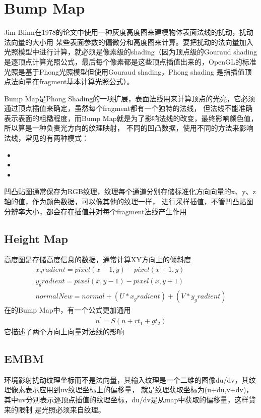 \section{Bump Map}

Jim Blinn在1978的论文中使用一种灰度高度图来建模物体表面法线的扰动，扰动法向量的大小用
某些表面参数的偏微分和高度图来计算。要把扰动的法向量加入光照模型中进行计算，就必须是像素级的shading（因为顶点级的Gouraud shading
是逐顶点计算光照公式，最后每个像素都是这些顶点插值出来的，OpenGL的标准光照是基于Phong光照模型但使用Gouraud shading，Phong shading
是指插值顶点法向量在fragment基本计算光照公式）。

Bump Map是Phong Shading的一项扩展，表面法线用来计算顶点的光亮，它必须通过顶点插值来确定，虽然每个fragment都有一个独特的法线，
但法线不能准确表示表面的粗糙程度，而Bump Map就是为了影响法线的改变，最终影响颜色值，所以算是一种负责光方向的纹理映射，
不同的凹凸数据，使用不同的方法来影响法线，常见的有两种模式：
\begin{itemize}
    \item {}
    \item {}
    \item {}
\end{itemize}

凹凸贴图通常保存为RGB纹理，纹理每个通道分别存储标准化方向向量的x、y、z轴的值，作为颜色数据，可以像其他的纹理一样，
进行采样插值，不管凹凸贴图分辨率大小，都会存在插值并对每个fragment法线产生作用


\subsection{Height Map}
高度图是存储高度信息的数据，通常计算XY方向上的倾斜度
\begin{gather*}
    x_gradient = pixel(x-1,y) - pixel(x+1,y) \\
    y_gradient = pixel(x,y-1) - pixel(x,y+1) \\
    normalNew = normal + (U * x_gradient) + (V * y_gradient)
\end{gather*}
在的Bump Map\cite{CGPP3ed}中，有一个公式更加通用
\begin{align*}
    n^{'} = S(n + rt_{1} + gt_{2})
\end{align*}
它描述了两个方向上向量对法线的影响

\subsection{EMBM}
环境影射扰动纹理坐标而不是法向量，其输入纹理是一个二维的图像du/dv，其纹理像素表示应用到uv纹理坐标上的偏移量，
就是纹理获取坐标为(u+du,v+dv)，其中uv分别表示逐顶点插值的纹理坐标，du/dv是从map中获取的偏移量，这样贷来的限制
是光照必须来自纹理。


